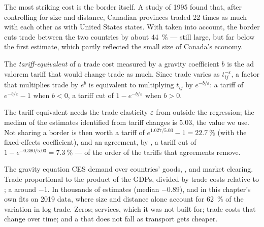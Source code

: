 The most striking cost is the border itself. A study of 1995 found that, after
controlling for size and distance, Canadian provinces traded 22 times as much
with each other as with United States states. With 
taken into account, the border cuts trade between the two countries by about
44~\% --- still large, but far below the first estimate, which partly reflected
the small size of Canada's economy. %

\begin{definition}\label{def:b3:gravity:tariff-equivalent}
The \emph{tariff-equivalent} of a trade cost measured by a gravity coefficient $b$
is the ad valorem tariff that would change trade as much. Since trade varies as
$t_{ij}^{-\varepsilon}$, a factor that multiplies trade by $e^{b}$ is equivalent to multiplying
$t_{ij}$ by $e^{-b/\varepsilon}$: a tariff of $e^{-b/\varepsilon} - 1$ when $b < 0$, a tariff cut of $1 -
e^{-b/\varepsilon}$ when $b > 0$.
\end{definition}

The tariff-equivalent needs the trade elasticity $\varepsilon$ from outside the
regression; the median of the estimates identified from tariff changes is 5.03,
the value we use. %
Not sharing a border is then worth a tariff of $e^{1.027/5.03} - 1 = 22.7~\%$ (with the
fixed-effects coefficient), and an agreement, by , a tariff cut of $1 -
e^{-0.380/5.03} = 7.3~\%$ --- of the order of the tariffs that agreements remove.

\begin{model}{The gravity equation}
\assumes CES demand over countries' goods, , and
market clearing.
\predicts Trade proportional to the product of the GDPs, divided by trade costs
relative to ; a  around $-1$.
\tested In thousands of estimates (median  $-0.89$), and in
this chapter's own fits on 2019 data, where size and distance alone account for 62~\%
of the variation in log trade. %
\breaks Zeros; services, which it was not built for; trade costs that change over
time; and a  that does not fall as transport gets cheaper.
\end{model}

